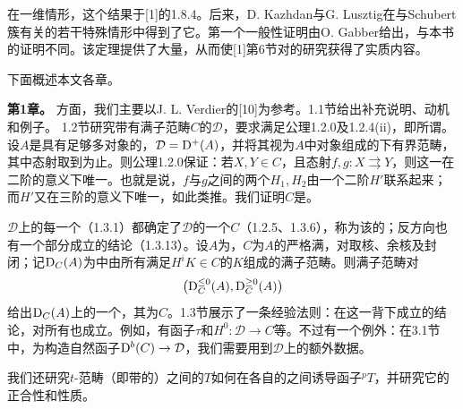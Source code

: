 在一维情形，这个结果于[1]的1.8.4。后来，D. Kazhdan与G. Lusztig在与Schubert簇有关的若干特殊情形中得到了它。第一个一般性证明由O. Gabber给出，与本书的证明不同。该定理提供了大量，从而使[1]第6节对的研究获得了实质内容。

下面概述本文各章。

\par\medskip\noindent\textbf{第1章。} 方面，我们主要以J. L. Verdier的[10]为参考。1.1节给出补充说明、动机和例子。
1.2节研究带有满子范畴$C$的$\mathcal D$，要求满足公理1.2.0及1.2.4(ii)，即所谓。设$A$是具有足够多对象的，$\mathcal D=\mathrm{D}^+(A)$，并将其视为$A$中对象组成的下有界范畴，其中态射取到为止。则公理1.2.0保证：若$X,Y\in C$，且态射$f,g:X\rightrightarrows Y$，则这一在二阶的意义下唯一。也就是说，$f$与$g$之间的两个$H_1,H_2$由一个二阶$H'$联系起来；而$H'$又在三阶的意义下唯一，如此类推。我们证明$C$是。

$\mathcal D$上的每一个（1.3.1）都确定了$\mathcal D$的一个$C$（1.2.5、1.3.6），称为该的；反方向也有一个部分成立的结论（1.3.13）。设$A$为，$C$为$A$的严格满，对取核、余核及封闭；记$\mathrm{D}_C(A)$为中由所有满足$H^iK\in C$的$K$组成的满子范畴。则满子范畴对
\[
\bigl(\mathrm{D}_C^{\leq0}(A),\mathrm{D}_C^{\geq0}(A)\bigr)
\]
给出$\mathrm{D}_C(A)$上的一个，其为$C$。1.3节展示了一条经验法则：在这一背下成立的结论，对所有也成立。例如，有函子$\tau$和$H^0:\mathcal D\to C$等。不过有一个例外：在3.1节中，为构造自然函子$\mathrm{D}^b(C)\to\mathcal D$，我们需要用到$\mathcal D$上的额外数据。

我们还研究$t$-范畴（即带的）之间的$T$如何在各自的之间诱导函子${}^pT$，并研究它的正合性和性质。

